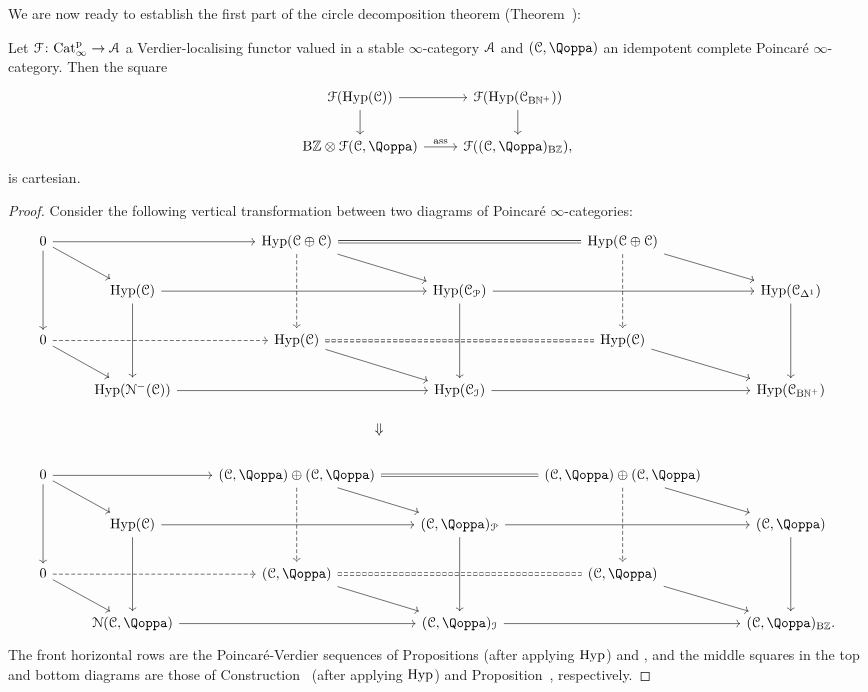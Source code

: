 We are now ready to establish the first part of the circle decomposition theorem (Theorem~\;):
	
\begin{theorem}
\label{theorem:circle-decomposition-idem}%
Let $\mathcal{F}\colon \mathrm{Cat}^{\mathrm p}_\infty \to \mathcal{A}$ a Verdier-localising functor valued in a stable $\infty$-category $\mathcal{A}$ and $(\C,\QF)$ an idempotent complete Poincaré $\infty$-category. Then the square
\[
\begin{tikzcd}
\F(\Hyp(\C)) \ar[r]\ar[d] & \F(\Hyp(\C_{\B\NN^+}))\ar[d] \\
{\B\ZZ} \otimes \F(\C,\QF) \ar[r, "\ass"] & \F((\C,\QF)_{\B\ZZ}),
\end{tikzcd}
\]
is cartesian.
\end{theorem}
\begin{proof}
Consider the following vertical transformation between two diagrams of Poincaré $\infty$-categories:
\[
\begin{tikzcd}
0 \ar[rr]\ar[dd]\ar[dr] && \Hyp(\C\oplus\C)\ar[dd,dashed] \ar[rr,equal]\ar[dr] && \Hyp(\C \oplus \C)\ar[dd,dashed] \ar[dr] & \\
& \Hyp(\C)\ar[rr]\ar[dd] && \Hyp(\C_{\mathcal{P}}) \ar[rr]\ar[dd] && \Hyp(\C_{\Del^1})\ar[dd] \\
0 \ar[rr, dashed]\ar[dr] && \Hyp(\C)  \ar[rr,equal,dashed]\ar[dr] && \Hyp(\C)\ar[dr]  & \\
& \Hyp(\cN^-(\C))\ar[rr] && \Hyp(\C_\I) \ar[rr] && \Hyp(\C_{\B\NN^+}) \\
&& \color{white}{\;} \ar[r,phantom,"\rotatebox{270}{$\Rightarrow$}"] & \color{white}{\;}  && \\
0 \ar[rr]\ar[dd]\ar[dr] && (\C,\QF) \oplus (\C,\QF)\ar[dd,dashed] \ar[rr,equal]\ar[dr] && (\C,\QF) \oplus (\C,\QF)\ar[dd,dashed] \ar[dr] & \\
& \Hyp(\C)\ar[rr]\ar[dd] && (\C,\QF)_{\mathcal{P}} \ar[rr]\ar[dd] && (\C,\QF)\ar[dd] \\
0 \ar[rr, dashed]\ar[dr] && (\C,\QF)  \ar[rr,equal,dashed]\ar[dr] && (\C,\QF)\ar[dr]  & \\
& \cN(\C,\QF)\ar[rr] && (\C,\QF)_\I \ar[rr] && (\C,\QF)_{\B\ZZ}.
\end{tikzcd}
\]
The front horizontal rows are the Poincaré-Verdier sequences of Propositions  (after applying $\operatorname{Hyp}$) and , and the middle squares in the top and bottom diagrams are those of Construction~ (after applying $\operatorname{Hyp}$) and Proposition~, respectively.

\end{proof}
